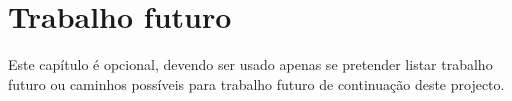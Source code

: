 \chapter{Trabalho futuro}
\label{cap:future}

Este capítulo é opcional, devendo ser usado apenas se pretender listar  trabalho futuro ou caminhos possíveis para trabalho futuro de continuação deste projecto.